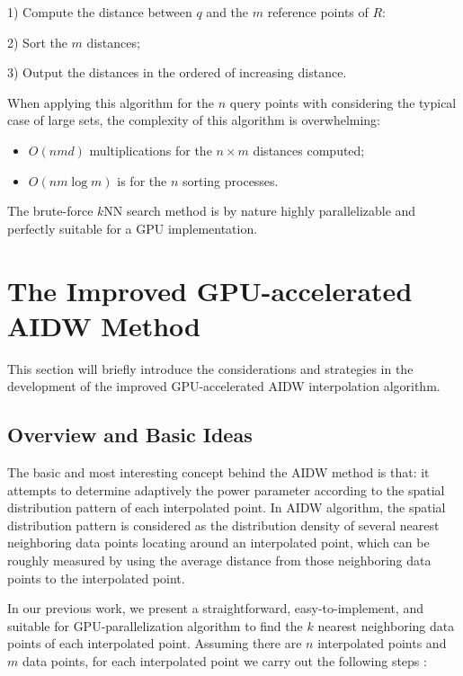 \documentclass[final,5p,times,twocolumn,authoryear]{elsarticle}
\begin{document}
			1) Compute the distance between $q$ and the $m$ reference points of $R$:
			
			2) Sort the $m$ distances;
			
			3) Output the distances in the ordered of increasing distance.
			
			When applying this algorithm for the $n$ query points with considering the typical 
			case of large sets, the complexity of this algorithm is overwhelming:
			
			\begin{itemize}
				\item $O(nmd)$ multiplications for the $n\times m$ distances computed;
				\item $O(nm\log m)$ is for the $n$ sorting processes.
			\end{itemize}
			
			The brute-force $k$NN search method is by nature highly parallelizable and 
			perfectly suitable for a GPU implementation.
			
			\section{The Improved GPU-accelerated AIDW Method}
			This section will briefly introduce the considerations and strategies in the 
			development of the improved GPU-accelerated AIDW interpolation algorithm.
			
			\subsection{Overview and Basic Ideas}
			The basic and most interesting concept behind the AIDW method is that: it 
			attempts to determine adaptively the power parameter according to the 
			spatial distribution pattern of each interpolated point. In AIDW algorithm, 
			the spatial distribution pattern is considered as the distribution density 
			of several nearest neighboring data points locating around an interpolated 
			point, which can be roughly measured by using the average distance from 
			those neighboring data points to the interpolated point.
			
			In our previous work, we present a straightforward, easy-to-implement, and 
			suitable for GPU-parallelization algorithm to find the $k$ nearest neighboring 
			data points of each interpolated point. Assuming there are $n$ interpolated 
			points and $m$ data points, for each interpolated point we carry out the 
			following steps \citep{29DBLP:journals/corr/MeiXX15}:
			
\end{document}
